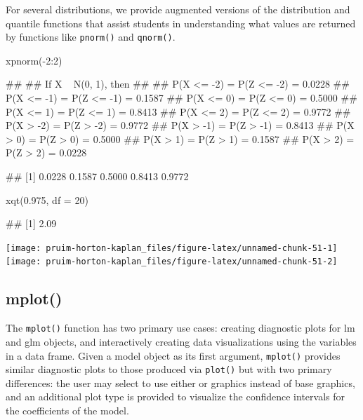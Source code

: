 For several distributions, we provide augmented versions of the
distribution and quantile functions that assist students in
understanding what values are returned by functions like
\texttt{pnorm()} and \texttt{qnorm()}.

\begin{Schunk}
\begin{Sinput}
xpnorm(-2:2)
\end{Sinput}
\begin{Soutput}
## 
## If X ~ N(0, 1), then 
## 
##  P(X <= -2) = P(Z <= -2) = 0.0228
##      P(X <= -1) = P(Z <= -1) = 0.1587
##      P(X <=  0) = P(Z <=  0) = 0.5000
##      P(X <=  1) = P(Z <=  1) = 0.8413
##      P(X <=  2) = P(Z <=  2) = 0.9772
##  P(X >  -2) = P(Z >  -2) = 0.9772
##      P(X >  -1) = P(Z >  -1) = 0.8413
##      P(X >   0) = P(Z >   0) = 0.5000
##      P(X >   1) = P(Z >   1) = 0.1587
##      P(X >   2) = P(Z >   2) = 0.0228
\end{Soutput}
\begin{Soutput}
## [1] 0.0228 0.1587 0.5000 0.8413 0.9772
\end{Soutput}
\begin{Sinput}
xqt(0.975, df = 20)
\end{Sinput}
\begin{Soutput}
## [1] 2.09
\end{Soutput}


\begin{center}\texttt{[image: pruim-horton-kaplan\_files/figure-latex/unnamed-chunk-51-1]} \texttt{[image: pruim-horton-kaplan\_files/figure-latex/unnamed-chunk-51-2]} \end{center}

\end{Schunk}

\subsection{mplot()}\label{mplot}

The \texttt{mplot()} function has two primary use cases: creating
diagnostic plots for lm and glm objects, and interactively creating data
visualizations using the variables in a data frame. Given a model object
as its first argument, \texttt{mplot()} provides similar diagnostic
plots to those produced via \texttt{plot()} but with two primary
differences: the user may select to use either  or
 \citep{ggplot2} graphics instead of base graphics, and
an additional plot type is provided to visualize the confidence
intervals for the coefficients of the model.

